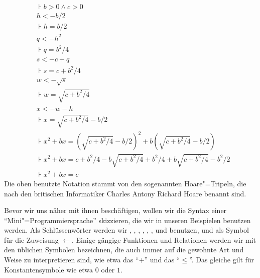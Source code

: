 \begin{align*}
&\assert{b>0 \land c>0} \\
&h <- b/2  \\
&\assert{h = b/2}   \\
&q <- h^2 \\
&\assert{q = b^2/4}   \\
&s <- c+q \\
&\assert{s = c + b^2/4}   \\
&w <- \sqrt{s} \\
&\assert{w = \sqrt{c + b^2/4}}  \\
&x <- w-h   \\
&\assert{x = \sqrt{c + b^2/4} - b/2 }  \\
&\assert{x^2+bx = (\sqrt{c + b^2/4} - b/2)^2 +b(\sqrt{c + b^2/4} - b/2) }  \\
&\assert{x^2+bx = {c + b^2/4} - b\sqrt{c + b^2/4} +b^2/4 +b\sqrt{c + b^2/4} - b^2/2 }  \\
&\assert{x^2+bx = c }  
\end{align*}
%
Die oben benutzte Notation stammt von den sogenannten Hoare"=Tripeln,
die nach den britischen Informatiker Charles Antony Richard Hoare
benannt sind.

Bevor wir uns näher mit ihnen beschäftigen, wollen wir die Syntax
einer "`Mini"=Programmiersprache"' skizzieren, die wir in unseren
Beispielen benutzen werden.
%
Als Schlüssenwörter werden wir , , , 
, , ,  und  benutzen, und als
Symbol für die Zuweisung $\gets$.
%
Einige gängige Funktionen und Relationen werden wir mit den üblichen
Symbolen bezeichnen, die auch immer auf die gewohnte Art und Weise zu
interpretieren sind, wie etwa das "`$+$"' und das "`$\leq$"'.
%
Das gleiche gilt für Konstantensymbole wie etwa $0$ oder $1$.

